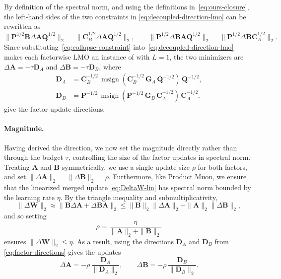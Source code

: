 \documentclass[11pt]{article}
\newcommand{\mat}[1]{\bm{#1}}
\DeclareMathOperator{\msign}{msign}          %
\newcommand{\norm}[1]{\| #1\|}
\begin{document}
By definition of the spectral norm, and using the definitions in~\eqref{eq:ours-closure}, the left-hand sides of the two constraints in \eqref{eq:decoupled-direction-lmo} can be rewritten as
\begin{equation} \label{eq:collapse-constraint}
\norm{\mat{P}^{1/2}\mat{B}\Delta\mat{A} \mat{Q}^{1/2}}_2=\norm{\mat{C}_B^{1/2}\Delta\mat{A} \mat{Q}^{1/2}}_2,
\qquad
\norm{\mat{P}^{1/2}\Delta\mat{B} \mat{A} \mat{Q}^{1/2}}_2=\norm{\mat{P}^{1/2}\Delta\mat{B} \mat{C}_A^{1/2}}_2 .
\end{equation}
Since substituting~\eqref{eq:collapse-constraint} into~\eqref{eq:decoupled-direction-lmo} makes each factorwise LMO an instance of  with $L=1$, the two minimizers are $\Delta\mat{A} = -\tau \mat{D}_A$ and $\Delta\mat{B} = -\tau \mat{D}_B$, where
\begin{equation}
  \begin{aligned}
  \mat{D}_A &=
  \mat{C}_B^{-1/2}\,
  \msign\!\left(\mat{C}_B^{-1/2}\,\mat{G}_A\,\mat{Q}^{-1/2}\right)
  \,\mat{Q}^{-1/2},\\
  \mat{D}_B &=
  \mat{P}^{-1/2}\,
  \msign\!\left(\mat{P}^{-1/2}\,\mat{G}_B\,\mat{C}_A^{-1/2}\right)
  \,\mat{C}_A^{-1/2}.
  \end{aligned}
  \label{eq:factor-directions}
\end{equation}
give the factor update directions.

\paragraph{Magnitude.}
Having derived the direction, we now set the magnitude directly rather than through the budget $\tau$, controlling the size of the factor updates in spectral norm. Treating $\mat{A}$ and $\mat{B}$ symmetrically, we use a single update size $\rho$ for both factors, and set $\norm{\Delta\mat{A}}_2=\norm{\Delta\mat{B}}_2=\rho$. Furthermore, like Product Muon, we ensure that the linearized merged update \eqref{eq:DeltaW-lin} has spectral norm bounded by the learning rate $\eta$. By the triangle inequality and submultiplicativity,
\begin{equation}
\norm{\Delta\mat{W}}_2
\approx
\norm{\mat{B}\Delta\mat{A}+\Delta\mat{B} \mat{A}}_2
\le
\norm{\mat{B}}_2\norm{\Delta\mat{A}}_2
+
\norm{\mat{A}}_2\norm{\Delta\mat{B}}_2,
\label{eq:ours-prodcap}
\end{equation}
and so setting
\begin{equation}
\rho = \frac{\eta}{\norm{\mat{A}}_2+\norm{\mat{B}}_2}
\label{eq:ours-rho}
\end{equation}
ensures $\norm{\Delta\mat{W}}_2\leq \eta$. As a result, using the directions $\mat{D}_A$ and $\mat{D}_B$ from \eqref{eq:factor-directions} gives the updates
\begin{equation}
\Delta\mat{A} = -\rho\,\frac{\mat{D}_A}{\norm{\mat{D}_A}_2},
\qquad
\Delta\mat{B} = -\rho\,\frac{\mat{D}_B}{\norm{\mat{D}_B}_2}.
\label{eq:polora-update}
\end{equation}
\end{document}
